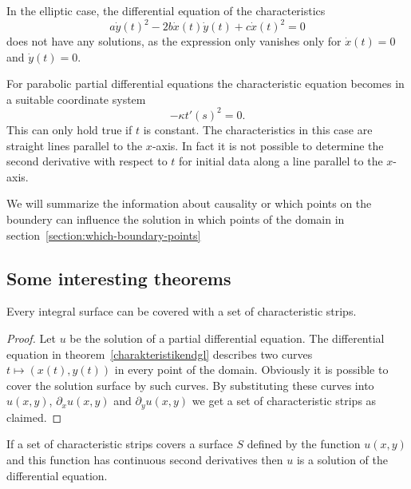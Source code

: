 In the elliptic case, the differential equation of the characteristics
\[
a\dot y(t)^2-2b\dot x(t)\dot y(t)+c\dot x(t)^2=0
\]
does not have any solutions, as the expression only vanishes only for
$\dot x(t)=0$ and $\dot y(t)=0$.

For parabolic partial differential equations the characteristic
equation becomes in a suitable coordinate system
\[
-\kappa t'(s)^2=0.
\]
This can only hold true if $t$ is constant.
The characteristics in this case are straight lines parallel
to the $x$-axis.
In fact it is not possible to determine the second derivative
with respect to $t$ for initial data along a line parallel
to the $x$-axis.

We will summarize the information about causality or which points on
the boundery can influence the solution in which points of the domain
in section~\ref{section:which-boundary-points}

\subsection{Some interesting theorems}

\begin{satz}
Every integral surface can be covered with a set of characteristic
strips.
\end{satz}

\begin{proof}
Let $u$ be the solution of a partial differential equation.
The differential equation in theorem~\ref{charakteristikendgl}
describes two curves $t\mapsto(x(t),y(t))$ in every point of the domain.
Obviously it is possible to cover the solution surface by such curves.
By substituting these curves into $u(x,y)$, $\partial_xu(x,y)$
and $\partial_yu(x,y)$ we get a set of characteristic strips
as claimed.
\end{proof}

\begin{satz}
If a set of characteristic strips covers a surface $S$ defined
by the function $u(x,y)$ and this function has continuous 
second derivatives then $u$ is a solution of the differential equation.
\end{satz}

